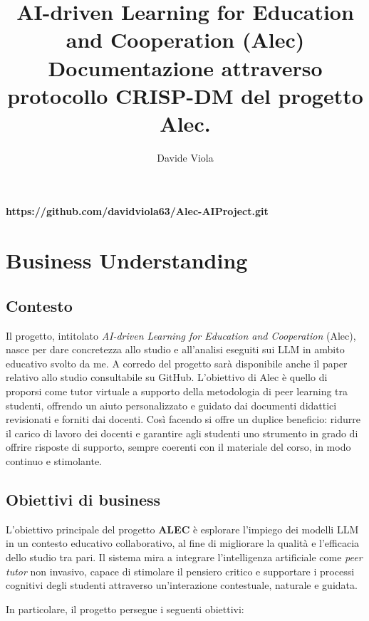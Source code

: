 \documentclass[a4paper,9pt]{article}
\title{AI-driven Learning for Education and Cooperation (Alec) \\
\large Documentazione attraverso protocollo CRISP-DM del progetto Alec.}
\author{Davide Viola}
\begin{document}
	
 	\maketitle
	\textbf{https://github.com/davidviola63/Alec-AIProject.git}
	
	\tableofcontents
	
	\newpage 
	\section{Business Understanding}
	
	\subsection{Contesto} Il progetto, intitolato \textit{AI-driven Learning for Education and Cooperation} (Alec), nasce per dare concretezza allo studio e all'analisi eseguiti sui LLM in ambito educativo svolto da me. A corredo del progetto sarà disponibile anche il paper relativo allo studio consultabile su GitHub.
	L'obiettivo di Alec è quello di proporsi come tutor virtuale a supporto della metodologia di peer learning tra studenti, offrendo un aiuto personalizzato e guidato dai documenti didattici revisionati e forniti dai docenti. Così facendo si offre un duplice beneficio: ridurre il carico di lavoro dei docenti e garantire agli studenti uno strumento in grado di offrire risposte di supporto, sempre coerenti con il materiale del corso, in modo  continuo e stimolante.
	
	\subsection{Obiettivi di business}
	L'obiettivo principale del progetto \textbf{ALEC} è esplorare l'impiego dei modelli LLM in un contesto educativo collaborativo, al fine di migliorare la qualità e l’efficacia dello studio tra pari. 
	Il sistema mira a integrare l’intelligenza artificiale come \emph{peer tutor} non invasivo, capace di stimolare il pensiero critico e supportare i processi cognitivi degli studenti attraverso un’interazione contestuale, naturale e guidata. 
	
	In particolare, il progetto persegue i seguenti obiettivi:
	
\end{document}
